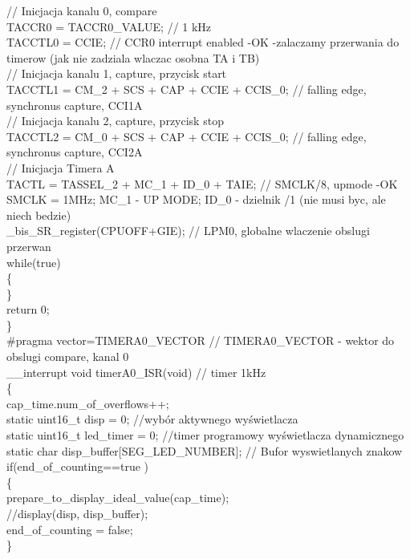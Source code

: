 \documentclass[a4paper,titlepage,11pt,floatssmall]{mwrep}
\begin{document}
    // Inicjacja kanalu 0, compare\\
    TACCR0 = TACCR0\_{}VALUE; // 1 kHz\\
    TACCTL0 = CCIE;         // CCR0 interrupt enabled -OK -zalaczamy przerwania do timerow (jak nie zadziala wlaczac osobna TA i TB)\\
    // Inicjacja kanalu 1, capture, przycisk start\\
    TACCTL1 =  CM\_{}2 + SCS + CAP + CCIE + CCIS\_{}0;  // falling edge, synchronus capture, CCI1A\\
    // Inicjacja kanalu 2, capture, przycisk stop\\
    TACCTL2 =  CM\_{}0 + SCS + CAP + CCIE + CCIS\_{}0;  // falling edge, synchronus capture, CCI2A\\
    // Inicjacja Timera A\\
    TACTL = TASSEL\_{}2 + MC\_{}1 + ID\_{}0 + TAIE;         // SMCLK/8, upmode -OK SMCLK = 1MHz; MC\_{}1 - UP MODE; ID\_{}0 - dzielnik /1 (nie musi byc, ale niech bedzie)\\

    \_{}bis\_{}SR\_{}register(CPUOFF+GIE); // LPM0, globalne wlaczenie obslugi przerwan\\

    while(true)\\
    \{\\

    \}\\

    return 0;\\
\}\\

\noindent \#pragma vector=TIMERA0\_{}VECTOR   // TIMERA0\_{}VECTOR - wektor do obslugi compare, kanal 0\\
\_{}\_{}interrupt void timerA0\_{}ISR(void) // timer 1kHz\\
\{\\
    cap\_{}time.num\_{}of\_{}overflows++;\\
    static uint16\_{}t disp = 0; //wybór aktywnego wyświetlacza\\
    static uint16\_{}t led\_{}timer = 0; //timer programowy wyświetlacza dynamicznego\\
    static char disp\_{}buffer[SEG\_{}LED\_{}NUMBER]; // Bufor wyswietlanych znakow\\

	if(end\_{}of\_{}counting==true )\\
	\{\\
		prepare\_{}to\_{}display\_{}ideal\_{}value(cap\_{}time);\\
		//display(disp, disp\_{}buffer);\\
		end\_{}of\_{}counting = false;\\
	\}\\
\end{document}
